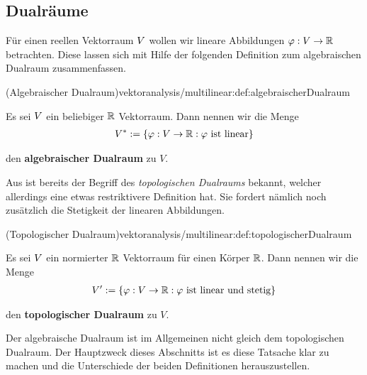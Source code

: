 \subsection{Dualräume}
\label{\detokenize{vektoranalysis/multilinear:dualraume}}
\par
Für einen reellen Vektorraum \(V\) wollen wir lineare Abbildungen \(\varphi:V\to\mathbb{R}\) betrachten.
Diese lassen sich mit Hilfe der folgenden Definition zum algebraischen Dualraum zusammenfassen.
\begin{definition}{(Algebraischer Dualraum)}{vektoranalysis/multilinear:def:algebraischerDualraum}



\par
Es sei \(V\) ein beliebiger \(\mathbb{R}\) Vektorraum.
Dann nennen wir die Menge
\begin{align*}
V^\ast := \{\varphi:V\rightarrow\mathbb{R}: \varphi\text{ ist linear}\}
\end{align*}
\par
den \textbf{algebraischer Dualraum} zu \(V\).
\end{definition}

\par
Aus \cite{Ten21} ist bereits der Begriff des \emph{topologischen Dualraums} bekannt, welcher allerdings eine etwas restriktivere Definition hat.
Sie fordert nämlich noch zusätzlich die Stetigkeit der linearen Abbildungen.
\begin{definition}{(Topologischer Dualraum)}{vektoranalysis/multilinear:def:topologischerDualraum}



\par
Es sei \(V\) ein normierter \(\mathbb{R}\) Vektorraum für einen Körper \(\mathbb{R}\).
Dann nennen wir die Menge
\begin{align*}
V^\prime := \{\varphi:V\rightarrow\mathbb{R}: \varphi\text{ ist linear und stetig}\}
\end{align*}
\par
den \textbf{topologischer Dualraum} zu \(V\).
\end{definition}

\begin{emphBox}{}{}
\par
Der algebraische Dualraum ist im Allgemeinen nicht gleich dem topologischen Dualraum.
Der Hauptzweck dieses Abschnitts ist es diese Tatsache klar zu machen und die Unterschiede der beiden Definitionen herauszustellen.
\end{emphBox}

